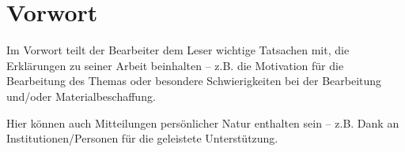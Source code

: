 

\chapter*{Vorwort}



Im Vorwort teilt der Bearbeiter dem Leser wichtige Tatsachen mit, die Erklärungen zu seiner Arbeit beinhalten -- z.B. die Motivation für die Bearbeitung des Themas oder besondere Schwierigkeiten bei der Bearbeitung und/oder Materialbeschaffung. 

Hier können auch Mitteilungen persönlicher Natur enthalten sein -- z.B. Dank an Institutionen/Personen für die geleistete Unterstützung. 